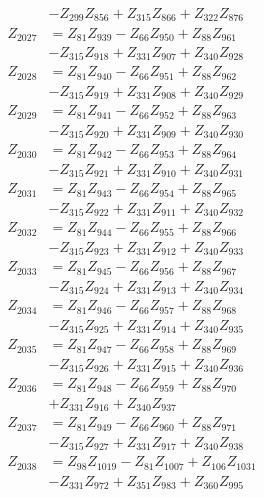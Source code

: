 \begin{multicols}{2}
\begin{align}
&- Z_{299}Z_{856} + Z_{315}Z_{866} + Z_{322}Z_{876} \nonumber \\
Z_{2027} &= Z_{81}Z_{939} - Z_{66}Z_{950} + Z_{88}Z_{961}  \nonumber \\
&- Z_{315}Z_{918} + Z_{331}Z_{907} + Z_{340}Z_{928} \nonumber \\
Z_{2028} &= Z_{81}Z_{940} - Z_{66}Z_{951} + Z_{88}Z_{962}  \nonumber \\
&- Z_{315}Z_{919} + Z_{331}Z_{908} + Z_{340}Z_{929} \nonumber \\
Z_{2029} &= Z_{81}Z_{941} - Z_{66}Z_{952} + Z_{88}Z_{963}  \nonumber \\
&- Z_{315}Z_{920} + Z_{331}Z_{909} + Z_{340}Z_{930} \nonumber \\
Z_{2030} &= Z_{81}Z_{942} - Z_{66}Z_{953} + Z_{88}Z_{964}  \nonumber \\
&- Z_{315}Z_{921} + Z_{331}Z_{910} + Z_{340}Z_{931} \nonumber \\
Z_{2031} &= Z_{81}Z_{943} - Z_{66}Z_{954} + Z_{88}Z_{965}  \nonumber \\
&- Z_{315}Z_{922} + Z_{331}Z_{911} + Z_{340}Z_{932} \nonumber \\
Z_{2032} &= Z_{81}Z_{944} - Z_{66}Z_{955} + Z_{88}Z_{966}  \nonumber \\
&- Z_{315}Z_{923} + Z_{331}Z_{912} + Z_{340}Z_{933} \nonumber \\
Z_{2033} &= Z_{81}Z_{945} - Z_{66}Z_{956} + Z_{88}Z_{967}  \nonumber \\
&- Z_{315}Z_{924} + Z_{331}Z_{913} + Z_{340}Z_{934} \nonumber \\
Z_{2034} &= Z_{81}Z_{946} - Z_{66}Z_{957} + Z_{88}Z_{968}  \nonumber \\
&- Z_{315}Z_{925} + Z_{331}Z_{914} + Z_{340}Z_{935} \nonumber \\
Z_{2035} &= Z_{81}Z_{947} - Z_{66}Z_{958} + Z_{88}Z_{969}  \nonumber \\
&- Z_{315}Z_{926} + Z_{331}Z_{915} + Z_{340}Z_{936} \nonumber \\
Z_{2036} &= Z_{81}Z_{948} - Z_{66}Z_{959} + Z_{88}Z_{970}  \nonumber \\
&+ Z_{331}Z_{916} + Z_{340}Z_{937} \nonumber \\
Z_{2037} &= Z_{81}Z_{949} - Z_{66}Z_{960} + Z_{88}Z_{971}  \nonumber \\
&- Z_{315}Z_{927} + Z_{331}Z_{917} + Z_{340}Z_{938} \nonumber \\
Z_{2038} &= Z_{98}Z_{1019} - Z_{81}Z_{1007} + Z_{106}Z_{1031}  \nonumber \\
&- Z_{331}Z_{972} + Z_{351}Z_{983} + Z_{360}Z_{995} \nonumber \\

\end{align}
\end{multicols}
